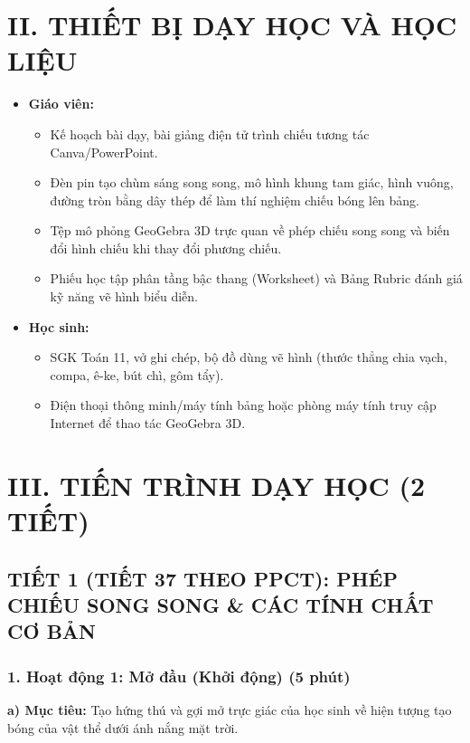 \documentclass[12pt, a4paper]{article}
\begin{document}
\section*{II. THIẾT BỊ DẠY HỌC VÀ HỌC LIỆU}

\begin{itemize}[leftmargin=1.2cm]
    \item \textbf{Giáo viên:}
    \begin{itemize}[leftmargin=0.6cm]
        \item Kế hoạch bài dạy, bài giảng điện tử trình chiếu tương tác Canva/PowerPoint.
        \item Đèn pin tạo chùm sáng song song, mô hình khung tam giác, hình vuông, đường tròn bằng dây thép để làm thí nghiệm chiếu bóng lên bảng.
        \item Tệp mô phỏng GeoGebra 3D trực quan về phép chiếu song song và biến đổi hình chiếu khi thay đổi phương chiếu.
        \item Phiếu học tập phân tầng bậc thang (Worksheet) và Bảng Rubric đánh giá kỹ năng vẽ hình biểu diễn.
    \end{itemize}
    \item \textbf{Học sinh:}
    \begin{itemize}[leftmargin=0.6cm]
        \item SGK Toán 11, vở ghi chép, bộ đồ dùng vẽ hình (thước thẳng chia vạch, compa, ê-ke, bút chì, gôm tẩy).
        \item Điện thoại thông minh/máy tính bảng hoặc phòng máy tính truy cập Internet để thao tác GeoGebra 3D.
    \end{itemize}
\end{itemize}

\section*{III. TIẾN TRÌNH DẠY HỌC (2 TIẾT)}

\subsection*{TIẾT 1 (TIẾT 37 THEO PPCT): PHÉP CHIẾU SONG SONG \& CÁC TÍNH CHẤT CƠ BẢN}

\subsubsection*{1. Hoạt động 1: Mở đầu (Khởi động) (5 phút)}

\noindent \textbf{a) Mục tiêu:}
Tạo hứng thú và gợi mở trực giác của học sinh về hiện tượng tạo bóng của vật thể dưới ánh nắng mặt trời.
\end{document}
